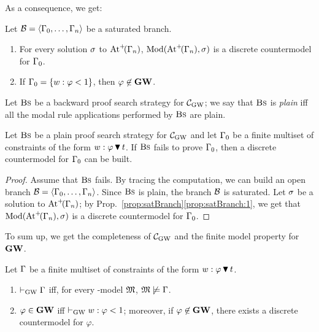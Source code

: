\noindent
As a consequence, we get:
\begin{proposition}\label{prop:satBranch}
  Let $\mathcal{B}=\langle \Gamma_0,\dots,\Gamma_n \rangle$ be a saturated branch.
  \begin{enumerate}[label=(\roman*), ref=(\roman*),leftmargin=*]
  \item\label{prop:satBranch:1} For every solution  $\sigma$  to
    $\mathrm{At}^{+}\!(\Gamma_n)$, $\mathrm{Mod}(\mathrm{At}^{+}\!(\Gamma_n),\sigma)$ is a discrete
    countermodel for $\Gamma_0$.
      
  \item\label{prop:satBranch:2} If $\Gamma_0=\{ w : \varphi < 1\}$, then
    $\varphi\not\in\mathbf{GW}$.
  \end{enumerate}
\end{proposition}

\noindent
Let $\mbox{\textsc{Bs}}$ be a backward proof search strategy for $\mathcal{C}_{\mathrm{GW}}$; we say
that $\mbox{\textsc{Bs}}$ is \emph{plain} iff all the modal rule applications
performed by $\mbox{\textsc{Bs}}$ are plain.


\begin{lemma}\label{lemma:search}
  Let $\mbox{\textsc{Bs}}$ be a plain proof search strategy for $\mathcal{C}_{\mathrm{GW}}$ and let
  $\Gamma_0$ be a finite multiset of constraints of the form
  $w:\varphi\,\blacktriangledown\, t$.  If $\mbox{\textsc{Bs}}$ fails to prove $\Gamma_0$, then a
  discrete countermodel for $\Gamma_0$ can be built.
\end{lemma}

\begin{proof}
  Assume that $\mbox{\textsc{Bs}}$ fails.  By tracing the computation, we can build
  an open branch $\mathcal{B}=\langle \Gamma_0,\dots,\Gamma_n \rangle$.  Since $\mbox{\textsc{Bs}}$ is
  plain, the branch $\mathcal{B}$ is saturated.  Let $\sigma$ be a solution to
  $\mathrm{At}^{+}\!(\Gamma_n)$; by Prop.~\ref{prop:satBranch}\ref{prop:satBranch:1},
  we get that $\mathrm{Mod}(\mathrm{At}^{+}\!(\Gamma_n),\sigma)$ is a discrete countermodel for
  $\Gamma_0$.
\end{proof}

\noindent
To sum up, we get the completeness of $\mathcal{C}_{\mathrm{GW}}$ and the finite model
property for $\mathbf{GW}$.



\begin{proposition}[Completeness]\label{prop:compl}
  Let $\Gamma$ be a finite multiset of constraints of the form
  $w:\varphi\,\blacktriangledown\, t$.
  \begin{enumerate}[label=(\roman*), ref=(\roman*),leftmargin=*]    
  \item\label{prop:compl:1}
    $\vdash_{\mathrm{GW}} \Gamma$ iff, for every \GWM-model  $\mathfrak{M}$,  $\mathfrak{M}\not\models\Gamma$.

    
  \item\label{prop:compl2}
    $\varphi\in\mathbf{GW}$ iff  $\vdash_{\mathrm{GW}} w:\varphi < 1$; moreover, if
    $\varphi\not\in\mathbf{GW}$, 
    there exists a discrete countermodel for $\varphi$.
\end{enumerate}
\end{proposition}


